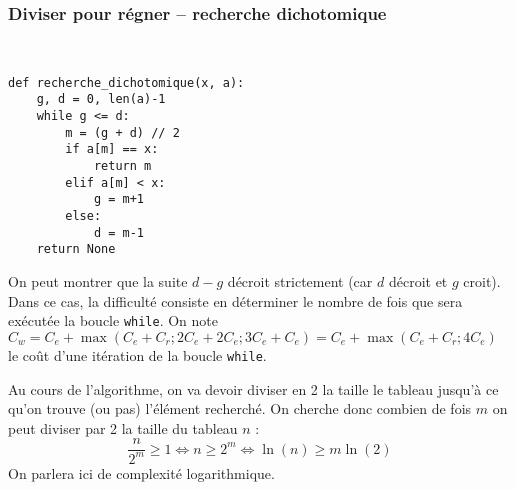 
\subsubsection{Diviser pour régner -- recherche dichotomique}
\begin{exemple}~\\ \vspace{-.3cm}
\begin{lstlisting}
def recherche_dichotomique(x, a):
    g, d = 0, len(a)-1
    while g <= d:
        m = (g + d) // 2
        if a[m] == x:
            return m
        elif a[m] < x:
            g = m+1
        else:
            d = m-1
    return None
\end{lstlisting}
On peut montrer que la suite $d-g$ décroit strictement (car $d$ décroit et $g$ croit).
Dans ce cas, la difficulté consiste en déterminer le nombre de fois que sera exécutée la boucle \texttt{while}. On note $C_w = C_e + \max\left(C_e + C_r ; 2 C_e + 2 C_e; 3 C_e + C_e \right) = C_e + \max\left(C_e + C_r ; 4 C_e  \right)$ le coût d'une itération de la boucle \texttt{while}.

Au cours de l'algorithme, on va devoir diviser en 2 la taille le tableau jusqu'à ce qu'on trouve (ou pas) l'élément recherché. On cherche donc combien de fois $m$ on peut diviser par 2 la taille du tableau $n$ :
$$
\dfrac{n}{2^m} \geq 1 \Longleftrightarrow n \geq 2^m \Longleftrightarrow \ln(n)\geq m \ln(2) $$
On parlera ici de complexité logarithmique.


%
%



\end{exemple}
